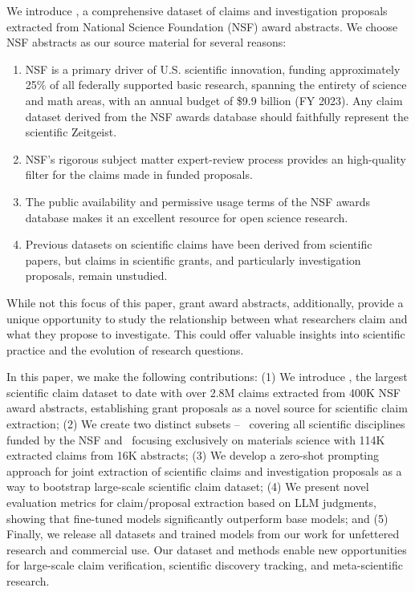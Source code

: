 \documentclass[11pt]{article}
\begin{document}
We introduce \DatasetName, a comprehensive dataset of claims and investigation proposals extracted from National Science Foundation (NSF) award abstracts. We choose NSF abstracts as our source material for several reasons:

\begin{enumerate}[noitemsep,topsep=0pt]
\item NSF is a primary driver of U.S. scientific innovation, funding approximately 25\% of all federally supported basic research, spanning the entirety of science and math areas, with an annual budget of \$9.9 billion (FY 2023). Any claim dataset derived from the NSF awards database should faithfully represent the scientific Zeitgeist. 
\item NSF's rigorous subject matter expert-review process provides an high-quality filter for the claims made in funded proposals.
\item The public availability and permissive usage terms of the NSF awards database makes it an excellent resource for open science research.
\item Previous datasets on scientific claims have been derived from scientific papers, but claims in scientific grants, and particularly investigation proposals, remain unstudied.
\end{enumerate}

While not this focus of this paper, grant award abstracts, additionally, provide a unique opportunity to study the relationship between what researchers claim and what they propose to investigate. This could offer valuable insights into scientific practice and the evolution of research questions.

In this paper, we make the following contributions: (1) We introduce \DatasetName, the largest scientific claim dataset to date with over 2.8M claims extracted from 400K NSF award abstracts, establishing grant proposals as a novel source for scientific claim extraction; (2) We create two distinct subsets -- \DatasetName~covering all scientific disciplines funded by the NSF and \DatasetNameMatSci~focusing exclusively on materials science with 114K extracted claims from 16K abstracts; (3) We develop a zero-shot prompting approach for joint extraction of scientific claims and investigation proposals as a way to bootstrap large-scale scientific claim dataset; (4) We present novel evaluation metrics for claim/proposal extraction based on LLM judgments, showing that fine-tuned models significantly outperform base models; and (5) Finally, we release all datasets and trained models from our work for unfettered research and commercial use. Our dataset and methods enable new opportunities for large-scale claim verification, scientific discovery tracking, and meta-scientific research.
\end{document}
